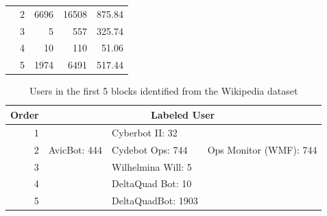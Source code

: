 \begin{table}[htbp]
\begin{tabular}{rrrrr}
                                                                                           & \multicolumn{1}{r|}{2} & 6696   & 16508  & 875.84   \\
                                                                                           & \multicolumn{1}{r|}{3} & 5      & 557    & 325.74   \\
                                                                                           & \multicolumn{1}{r|}{4} & 10     & 110    & 51.06    \\
                                                                                           & \multicolumn{1}{r|}{5} & 1974   & 6491   & 517.44   \\ \hline
\end{tabular}
\end{table}

\begin{table}[htbp]
\centering
\caption{Users in the first 5 blocks identified from the Wikipedia dataset}
\label{tab: wiki}
\begin{tabular}{r|lll}
\hline
\multicolumn{1}{l|}{Order} & \multicolumn{3}{c}{Labeled User}                              \\ \hline
1                                &     &       Cyberbot II: 32          &                        \\
2                                & AvicBot: 444       & Cydebot Ops: 744 & Ops Monitor (WMF): 744 \\
3                                & &      Wilhelmina Will: 5             &                        \\
4                                &  &     DeltaQuad Bot: 10              &                        \\
5                                &  &   DeltaQuadBot: 1903               &                        \\ \hline
\end{tabular}
\end{table}


